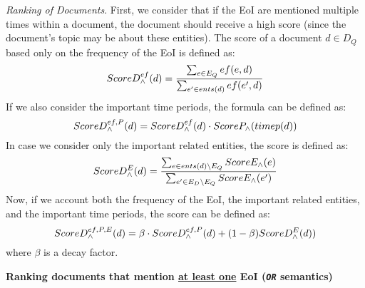\documentclass[runningheads,a4paper]{libtex/llncs}
\begin{document}
\vspace{1mm}
\noindent
{\em Ranking of Documents}.
First, we consider that if the EoI are mentioned multiple times
within a document, the document should receive a high score
(since the document's topic may be about these entities).
The score of a document $d \in D_Q$ based only on the frequency of the EoI is
defined as:
\begin{equation}
\small
ScoreD^{ef}_{\wedge}(d) = \frac{\sum_{e \in E_Q}{ef(e, d)}}{\sum_{e' \in ents(d)}{ef(e', d)}}
\end{equation}
If we also consider the important time periods, the formula can be defined as:
\begin{equation}
\small
ScoreD^{ef,P}_{\wedge}(d) =  ScoreD^{ef}_{\wedge}(d) \cdot  ScoreP_\wedge(timep(d))
\end{equation}
In case we consider only the important related entities, the score is defined as:
\begin{equation}
\small
ScoreD^{E}_{\wedge}(d) = \frac{\sum_{e \in ents(d) \setminus E_Q}{ScoreE_\wedge(e)}}{\sum_{e' \in E_D \setminus E_Q}{ScoreE_\wedge(e')}}
\end{equation}
Now, if we account both the frequency of the EoI, the important related entities,
and the important time periods, the score can be defined as:
\begin{equation}
\small
ScoreD^{ef,P,E}_{\wedge}(d) = \beta \cdot ScoreD^{ef, P}_{\wedge}(d) +
                              (1 - \beta) ScoreD^{E}_{\wedge}(d))
\end{equation}
where $\beta$ is a decay factor.



\vspace{5mm}
\noindent
{\bf Ranking documents that mention \underline{at least one} EoI ({\tt\em OR} semantics)}




\clearpage
\end{document}

